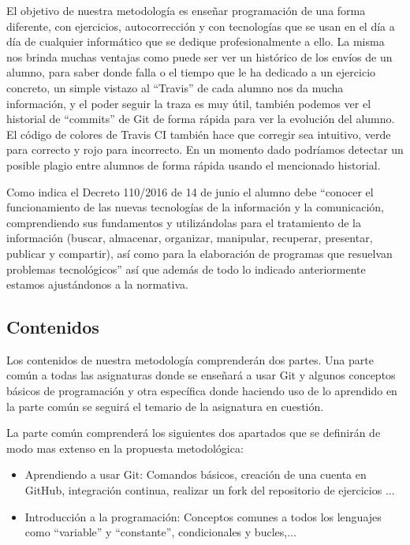 \bigskip
El objetivo de nuestra metodología es enseñar programación de una forma diferente, con ejercicios, autocorrección y con tecnologías que se usan en el día a día de cualquier informático que se dedique profesionalmente a ello. La misma nos brinda muchas ventajas como puede ser ver un histórico de los envíos de un alumno, para saber donde falla o el tiempo que le ha dedicado a un ejercicio concreto, un simple vistazo al ``Travis'' de cada alumno nos da mucha información, y el poder seguir la traza es muy útil, también podemos ver el historial de ``commits'' de Git de forma rápida para ver la evolución del alumno. El código de colores de Travis CI también hace que corregir sea intuitivo, verde para correcto y rojo para incorrecto. En un momento dado podríamos detectar un posible plagio entre alumnos de forma rápida usando el mencionado historial.

\bigskip
Como indica el Decreto 110/2016  de 14 de junio el alumno debe ``conocer el funcionamiento de las nuevas tecnologías de la información y la comunicación, comprendiendo sus fundamentos y utilizándolas para el tratamiento de la información (buscar, almacenar, organizar, manipular, recuperar, presentar, publicar y compartir), así como para la elaboración de programas que resuelvan problemas tecnológicos'' así que además de todo lo indicado anteriormente estamos ajustándonos a la normativa.


\subsection{Contenidos}

Los contenidos de nuestra metodología comprenderán dos partes. Una parte común a todas las asignaturas donde se enseñará a usar Git y algunos conceptos básicos de programación y otra específica donde haciendo uso de lo aprendido en la parte común se seguirá el temario de la asignatura en cuestión.


\bigskip
La parte común comprenderá los siguientes dos apartados que se definirán de modo mas extenso en la propuesta metodológica:

\begin{itemize}
    \item Aprendiendo a usar Git: Comandos básicos, creación de una cuenta en GitHub, integración continua, realizar un fork del repositorio de ejercicios ...
    \item Introducción a la programación: Conceptos comunes a todos los lenguajes como ``variable'' y ``constante'', condicionales y bucles,...
\end{itemize}

